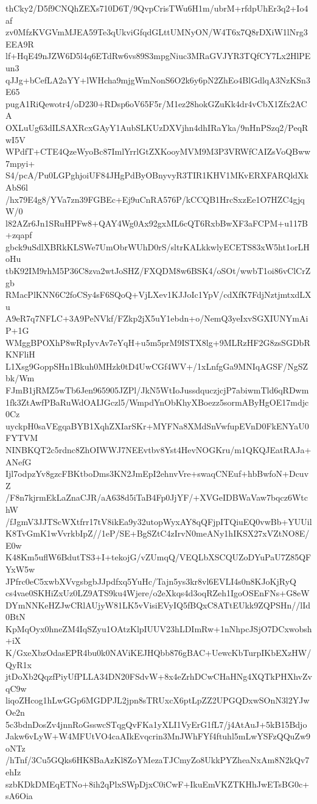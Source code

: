 thCky2/D5f9CNQhZEXs710D6T/9QvpCrisTWu6H1m/ubrM+rfdpUhEr3q2+Io4af
zv0MfzKVGVmMJEA59Te3qUkviGfqdGLttUMNyON/W4T6x7Q8rDXiW1lNrg3EEA9R
lf+HqE49nJZW6D5l4q6ETdRw6vs89S3mpgNiuc3MRaGVJYR3TQfCY7Lx2HlPEun3
qJJg+bCefLA2aYY+lWHcha9mjgWmNonS6O2k6y6pN2ZhEo4BlGdlqA3NzKSn3E65
pugA1RiQewotr4/oD230+RDsp6oV65F5r/M1ez28hokGZuKk4dr4vCbX1Zfx2ACA
OXLuUg63dILSAXRcxGAyY1AubSLKUzDXVjhn4dhIRaYka/9nHnPSzq2/PeqRwI5V
WPdfT+CTE4QzeWyoBc87ImlYrrlGtZXKooyMVM9M3P3VRWfCAIZsVoQBww7mpyi+
S4/pcA/Pu0LGPghjoiUF84JHgPdByOBnyvyR3TIR1KHV1MKvERXFARQldXkAbS6l
/hx79E4g8/YVa7zn39FGBEc+Ej9uCnRA576P/kCCQB1HrcSxzEe1O7HZC4gjqW/0
l82AZr6Jn1SRuHPFw8+QAY4Wg0Ax92gxML6cQT6RxbBwXF3aFCPM+u117B+zqapf
gbck9uSdlXBRkKLSWe7UmObrWUhD0rS/sltrKALkkwlyECETS83xW5ht1orLHoHu
tbK92IM9rhM5P36C8zva2wtJoSHZ/FXQDM8w6BSK4/oSOt/wwbT1oi86vClCrZgb
RMacPlKNN6C2foCSy4sF6SQoQ+VjLXev1KJJoIc1YpV/cdXfK7FdjNztjmtxdLXu
A9eR7q7NFLC+3A9PeNVkf/FZkp2jX5uY1ebdn+o/NemQ3yeIxvSGXIUNYmAiP+1G
WMggBPOXhP8wRpIyvAv7eYqH+u5m5prM9ISTX8lg+9MLRzHF2G8zsSGDbRKNFliH
L1Xsg9GoppSHn1Bkuh0MHzk0tD4UwCGf4WV+/1xLnfgGa9MNIqAGSF/NgSZbk/Wm
FJmB1jRMZ5wTb6Jen965905JZPl/JkN5WtIoJussdquczjcjP7abiwmTld6qRDwm
1fk3ZtAwfPBaRuWdOAIJGczl5/WmpdYnObKhyXBoezz5sormAByHgOE17mdjc0Cz
uyckpH0saVEgqaBYB1XqhZXIarSKr+MYFNa8XMdSnVwfupEVnD0FkENYaU0FYTVM
NINBKQT2c5rdnc8ZhOIWWJ7NEEvtbv8Yst4HevNOGKru/m1QKQJEatRAJa+ANefG
Ijl7odpzYv8gzcFBKtboDms3KN2JmEpI2ehnvVre+swaqCNEuf+hbBwfoN+DcuvZ
/F8n7kjrmEkLaZnaCJR/aA638d5iTaB4Fp0JjYF/+XVGeIDBWaVaw7bqcz6WtchW
/fJgmV3JJTScWXtfrr17tV8ikEa9y32utopWyxAY8qQFjpITQiuEQ0vwBb+YUUil
K8TvGmK1wVvrkbIpZ//1eP/SE+BgSZtC4zIrvN0meANy1hIKSX27xVZtNO8E/E0w
K48Km5uflW6BdutTS3+I+tekojG/vZUmqQ/VEQLbXSCQUZoDYuPaU7Z85QFYxW5w
JPfrc0eC5xwbXVvgsbgbJJpdfxq5YuHc/Tajn5ys3kr8vl6EVLI4s0n8KJoKjRyQ
cs4vae0SKHiZxUz0LZ9ATS9ku4Wjere/o2eXkqs4d3oqRZeh1IgoOSEnFNs+G8eW
DYmNNKeHZJwCRlAUjyW81LK5vVisiEVyIQ5fBQxC8ATtEUkk9ZQPSHn//lId0BtN
KpMqOyx0hneZM4IqSZyu1OAtzKlpIUUV23hLDImRw+1nNhpcJSjO7DCxwobsh+iX
K/GxeXbzOdasEPR4bu0k0NAViKEJHQbb876gBAC+UewcKbTurpIKbEXzHW/QyR1x
jtDoXb2QqzfPiyUfPLLA34DN20FSdvW+8x4eZrhDCwCHaHNg4XQTkPHXhvZvqC9w
liqoZHcog1hLwGGp6MGDPJL2jpn8sTRUxcX6ptLpZZ2UPGQDxwSOnN3l2YJwOe2n
5c3bdnDosZv4jnnRoGsswcSTqgQvFKa1yXLI1VyErG1fL7/j4AtAuJ+5kB15Bdjo
Jakw6vLyW+W4MFUtVO4caAIkEvqcrin3MnJWhFYf4ftuhl5mLwYSFzQQuZw9oNTz
/hTnf/3Cu5GQks6HK8BaAzKl8ZoYMezaTJCmyZo8UkkPYZheaNxAm8N2kQv7ehIz
szbKDkDMEqETNo+8ih2qPlxSWpDjxC0iCwF+IkuEmVKZTKHhJwETsBG0c+sA6Oia
